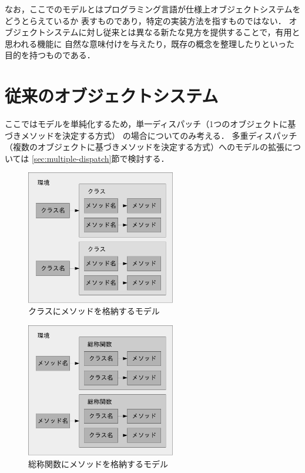 \documentclass{ipsjprosym}
\begin{document}
なお，ここでのモデルとはプログラミング言語が仕様上オブジェクトシステムをどうとらえているか
表すものであり，特定の実装方法を指すものではない．
オブジェクトシステムに対し従来とは異なる新たな見方を提供することで，有用と思われる機能に
自然な意味付けを与えたり，既存の概念を整理したりといった目的を持つものである．

\section{従来のオブジェクトシステム}

ここではモデルを単純化するため，単一ディスパッチ（1つのオブジェクトに基づきメソッドを決定する方式）
の場合についてのみ考える．
多重ディスパッチ（複数のオブジェクトに基づきメソッドを決定する方式）へのモデルの拡張については
\ref{sec:multiple-dispatch}節で検討する．

\begin{figure}
\centering
\includegraphics[width=6.5cm]{fig/classes-crop.pdf}
\caption{クラスにメソッドを格納するモデル}
\label{fig:classes}
\end{figure}

\begin{figure}
\centering
\includegraphics[width=6.5cm]{fig/generic-functions-crop.pdf}
\caption{総称関数にメソッドを格納するモデル}
\label{fig:generic-functions}
\end{figure}
\end{document}
